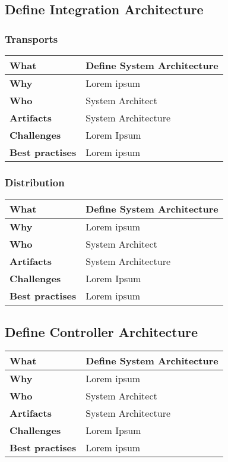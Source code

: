 \subsection{Define Integration Architecture}
\subsubsection{Transports}
 \label{table:ch6_Task_Define_Integration_Architecture}
\begin{tabular}
	{|m{3cm}|m{10cm}|} \hline \bfseries What & Define System Architecture\\
	\hline \bfseries Why & Lorem ipsum\\
	\hline \bfseries Who & System Architect\\
	\hline \bfseries Artifacts & System Architecture\\
	\hline \bfseries Challenges & Lorem Ipsum\\
	\hline \bfseries Best practises & Lorem ipsum\\
	\hline 
\end{tabular}

\subsubsection{Distribution}
 \label{table:ch6_Task_Distribution}
\begin{tabular}
	{|m{3cm}|m{10cm}|} \hline \bfseries What & Define System Architecture\\
	\hline \bfseries Why & Lorem ipsum\\
	\hline \bfseries Who & System Architect\\
	\hline \bfseries Artifacts & System Architecture\\
	\hline \bfseries Challenges & Lorem Ipsum\\
	\hline \bfseries Best practises & Lorem ipsum\\
	\hline 
\end{tabular}

\subsection{Define Controller Architecture}
 \label{table:ch6_Task_Define_Controller_Architecture}
\begin{tabular}
	{|m{3cm}|m{10cm}|} \hline \bfseries What & Define System Architecture\\
	\hline \bfseries Why & Lorem ipsum\\
	\hline \bfseries Who & System Architect\\
	\hline \bfseries Artifacts & System Architecture\\
	\hline \bfseries Challenges & Lorem Ipsum\\
	\hline \bfseries Best practises & Lorem ipsum\\
	\hline 
\end{tabular}

